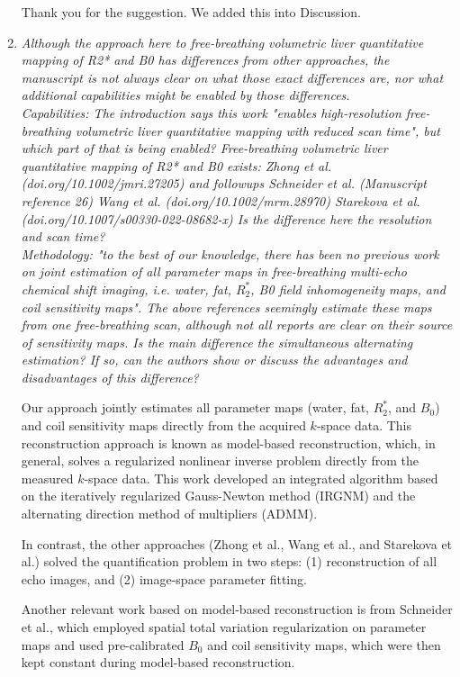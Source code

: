 \documentclass[a4paper,11pt]{report}
\begin{document}
\begin{enumerate}
\hspace{1em} Thank you for the suggestion. We added this into Discussion.

	\item \textit{Although the approach here to free-breathing volumetric liver quantitative mapping of R2* and B0 has differences from other approaches, the manuscript is not always clear on what those exact differences are, nor what additional capabilities might be enabled by those differences. \\
	Capabilities: The introduction says this work "enables high-resolution free-breathing volumetric liver quantitative mapping with reduced scan time", but which part of that is being enabled? Free-breathing volumetric liver quantitative mapping of R2* and B0 exists:
	Zhong et al. (doi.org/10.1002/jmri.27205) and followups
	Schneider et al. (Manuscript reference 26)
	Wang et al. (doi.org/10.1002/mrm.28970)
	Starekova et al. (doi.org/10.1007/s00330-022-08682-x)
	Is the difference here the resolution and scan time?\\
	Methodology: "to the best of our knowledge, there has been no previous work on joint estimation of all parameter maps in free-breathing multi-echo chemical shift imaging, i.e. water, fat, $R_2^*$, B0 field inhomogeneity maps, and coil sensitivity maps". The above references seemingly estimate these maps from one free-breathing scan, although not all reports are clear on their source of sensitivity maps. Is the main difference the simultaneous alternating estimation? If so, can the authors show or discuss the advantages and disadvantages of this difference?}

\hspace{1em} Our approach jointly estimates all parameter maps (water, fat, $R_2^*$, and $B_0$) 
and coil sensitivity maps directly from the acquired $k$-space data. 
This reconstruction approach is known as model-based reconstruction, which, in general, 
solves a regularized nonlinear inverse problem directly from the measured $k$-space data. 
This work developed an integrated algorithm based on 
the iteratively regularized Gauss-Newton method (IRGNM) and 
the alternating direction method of multipliers (ADMM). 

\hspace{1em} In contrast, the other approaches (Zhong et al., Wang et al., and Starekova et al.) 
solved the quantification problem in two steps: 
(1) reconstruction of all echo images, and (2) image-space parameter fitting. 

\hspace{1em} Another relevant work based on model-based reconstruction is from Schneider et al., 
which employed spatial total variation regularization on parameter maps and used
	pre-calibrated $B_0$ and coil sensitivity maps, 
which were then kept constant during model-based reconstruction.

\end{enumerate}
\end{document}
